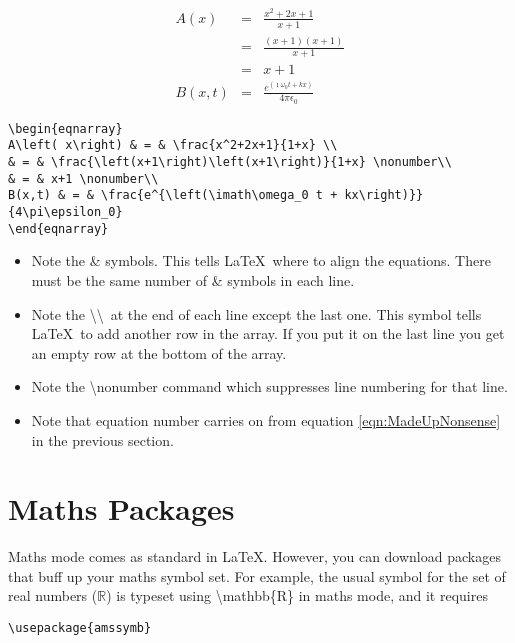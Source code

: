 \begin{eqnarray}
A\left( x\right) & = & \frac{x^2+2x+1}{x+1} \\
& = & \frac{\left(x+1\right)\left(x+1\right)}{x+1} \nonumber\\
& = & x+1 \nonumber\\
B(x,t) & = & \frac{e^{\left(\imath\omega_0 t + kx\right)}}{4\pi\epsilon_0}
\end{eqnarray}

\begin{verbatim}
\begin{eqnarray}
A\left( x\right) & = & \frac{x^2+2x+1}{1+x} \\
& = & \frac{\left(x+1\right)\left(x+1\right)}{1+x} \nonumber\\
& = & x+1 \nonumber\\
B(x,t) & = & \frac{e^{\left(\imath\omega_0 t + kx\right)}}{4\pi\epsilon_0}
\end{eqnarray}
\end{verbatim}

\begin{itemize}
\item Note the \& symbols. This tells \LaTeX\ where to align the equations. There must be the same number of \& symbols in each line.
\item Note the \textbackslash\textbackslash ~at the end of each line except the last one. This symbol tells \LaTeX\ to add another row in the array.  If you put it on the last line you get an empty row at the bottom of the array.
\item Note the {\textbackslash}nonumber command which suppresses line numbering for that line.
\item Note that equation number carries on from equation \ref{eqn:MadeUpNonsense} in the previous section.
\end{itemize}

\section{Maths Packages}

Maths mode comes as standard in \LaTeX. However, you can download packages that buff up your maths symbol set. For example, the usual symbol for the set of real numbers ($\mathbb{R}$) is typeset using {\textbackslash}mathbb\{R\} in maths mode, and it requires

\begin{verbatim}
\usepackage{amssymb}
\end{verbatim}

